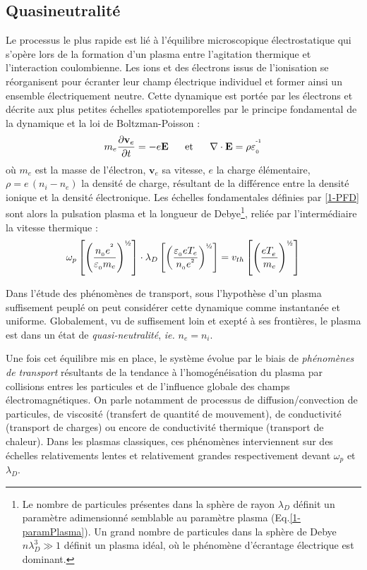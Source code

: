 		\subsection{Quasineutralité}
			Le processus le plus rapide est lié à
			l'équilibre microscopique électrostatique qui s'opère lors de la formation
			d'un plasma entre l'agitation thermique et l'interaction coulombienne. Les
			ions et des électrons issus de l'ionisation se réorganisent pour écranter
			leur champ électrique individuel et former ainsi un ensemble électriquement neutre. 
			Cette dynamique est portée par les électrons et décrite aux plus petites
			échelles spatiotemporelles par le principe fondamental de la dynamique et la loi de Boltzman-Poisson :
			\begin{align}
			\label{1-PFD}
				m_e\frac{\partial \mathbf{v}_e}{\partial t}=-e\mathbf E
				\;\;\;\;\;\;\text{et}\;\;\;\;\;\;
				\nabla\cdot\mathbf{E}=\rho\varepsilon_{_0}^{\operatorname{^{-1}}}
			\end{align} 
			où $m_e$ est la masse de l'électron, $\mathbf{v}_e$ sa vitesse,
			$e$ la charge élémentaire, $\rho=e\,(n_i-n_e)$ la densité de charge,
			résultant de la différence entre la densité ionique et la densité électronique.
			Les échelles fondamentales définies par \ref{1-PFD} sont alors la pulsation
			plasma et la longueur de Debye\footnote{Le nombre de particules présentes
			dans la sphère de rayon $\lambda_D$ définit un paramètre adimensionné
			semblable au paramètre plasma (Eq.\ref{1-paramPlasma}). Un
			grand nombre de particules dans la sphère de Debye $n\lambda_D^3\gg1$
			définit un plasma idéal, où le phénomène d'écrantage électrique est
			dominant.}, reliée par l'intermédiaire la vitesse thermique : 
			\begin{equation}
				\omega_p\left[\left(\frac{n_{_0}e^{^2}}{\varepsilon_{_0}
				m_e}\right)^\text{\textonehalf}
				\right]\cdot\lambda_D\left[\left(\frac{\varepsilon_{_0}
				eT_e}{n_{_0}e^{^2}}\right)^\text{\textonehalf}\right]
				=v_{th}\left[\left(\frac{eT_e^{^{\phantom{1}}}}{m_e}\right)^\text{\textonehalf}\right]
			\end{equation}
			
			Dans l'étude des phénomènes de transport, sous l'hypothèse d'un plasma
			suffisement peuplé on peut considérer cette dynamique comme instantanée et
			uniforme.
			Globalement, vu de suffisement loin et exepté à ses frontières, le plasma
			est dans un état de \emph{quasi-neutralité}, \emph{ie.} $n_e=n_i$.
			
			Une fois cet équilibre mis en place, le système évolue par le biais de
			\emph{phénomènes de transport} résultants de la tendance à
			l'homogénéisation du plasma par collisions entres les particules et de
			l'influence globale des champs électromagnétiques. On parle notamment de
			processus de diffusion/convection de particules, de viscosité (transfert de
			quantité de mouvement), de conductivité (transport de charges) ou encore de
			conductivité thermique (transport de chaleur). Dans les plasmas
			classiques, ces phénomènes interviennent sur des échelles relativements
			lentes et relativement grandes respectivement devant $\omega_p$ et
			$\lambda_D$.
